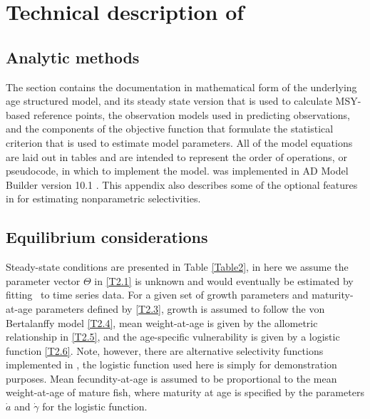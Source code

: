 \section{Technical description of \iscam}\label{appiSCAM}
	\subsection{Analytic methods}
	The section contains the documentation in mathematical form of the underlying age structured model, and its steady state version that is used to calculate MSY-based reference points, the observation models used in predicting observations, and the components of the objective function that formulate the statistical criterion that is used to estimate model parameters. All of the model equations are laid out in tables and are intended to represent the order of operations, or pseudocode, in which to implement the model. \iscam was implemented in AD Model Builder version 10.1 \cite{ADMB2009}.  This appendix also describes some of the optional features in \iscam for estimating nonparametric selectivities.

\subsection{Equilibrium considerations}

Steady-state conditions are presented in Table \ref{Table2}, in here we assume the parameter vector $\Theta$ in \eqref{T2.1} is unknown and would eventually be estimated by fitting \iscam\ to time series data.  For a given set of growth parameters and maturity-at-age parameters defined by \eqref{T2.3}, growth is assumed to follow the von Bertalanffy model \eqref{T2.4}, mean weight-at-age is given by the allometric relationship in \eqref{T2.5}, and the age-specific vulnerability is given by a logistic function \eqref{T2.6}.  Note, however, there are alternative selectivity functions implemented in \iscam, the logistic function used here is simply for demonstration purposes.  Mean fecundity-at-age is assumed to be proportional to the mean weight-at-age of mature fish, where maturity at age is specified by the parameters $\dot{a}$ and $\dot{\gamma}$ for the logistic function.

